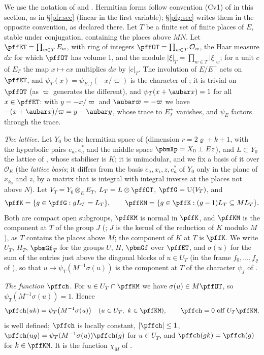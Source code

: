 \documentclass[10pt]{amsart}
\theoremstyle{definition}
\theoremstyle{remark}
\providecommand{\auO}{\mathcal O}
\providecommand{\auU}{\mathrm U}
\begin{document}
We use the notation of {\cite[\S2.1]{P51}} and {\cite[\S3.3]{P51}}. Hermitian forms follow convention (Cv1) of
{\cite[\S2.1]{P51}} in this section, as in \S\ref{pfr:sec} (linear in the first variable); \S\ref{pfg:sec} writes them
in the opposite convention, as declared there. Let $T$ be a finite set of
finite places of $E$, stable under conjugation, containing the places above $MN$. Let
$\pffET=\prod_{w\in T}E_w$, with ring of integers $\pffOT=\prod_{w\in T}\auO_w$, the Haar measure
$dx$ for which $\pffOT$ has volume $1$, and the module $|\xi|_T=\prod_{w\in T}|\xi|_w$; for a unit
$c$ of $E_T$ the map $x\mapsto cx$ multiplies $dx$ by $|c|_T$. The involution of $E/E^+$ acts on
$\pffET$, and $\psi_T(x)=\psi_{E,f}(-x/\varpi)$ is the character of {\cite[\S3.3.3]{P51}}; it is
trivial on $\pffOT$ (as $\varpi$ generates the different), and $\psi_T(x+\aubar x)=1$ for all
$x\in\pffET$: with $y=-x/\varpi$ and $\aubar\varpi=-\varpi$ we have $-(x+\aubar x)/\varpi=y-\aubar
y$, whose trace to $E^+_T$ vanishes, and $\psi_E$ factors through the trace.

\emph{The lattice.} Let $Y_0$ be the hermitian space of {\cite[\S2.1]{P51}} (dimension
$r=2\varrho+k+1$, with the hyperbolic pairs $e_a,e_a^*$ and the middle space $\pbmXp=X_0\perp
Ez$), and $L\subset Y_0$ the lattice of {\cite[\S2.1]{P51}}, whose stabiliser is $K$; it is
unimodular, and we fix a basis of it over $\auO_E$ (the \emph{lattice basis}; it differs from the
basis $e_a,x_i,z,e_a^*$ of $Y_0$ only in the plane of $x_{k_0}$ and $z$, by a matrix that is integral
with integral inverse at the places not above $N$). Let $V_T=Y_0\otimes_EE_T$,
$L_T=L\otimes\pffOT$, $\pffG=\auU(V_T)$, and
\[
\pffK=\{g\in\pffG:gL_T=L_T\},\qquad\pffKM=\{g\in\pffK:(g-1)L_T\subseteq ML_T\}.
\]
Both are compact open subgroups, $\pffKM$ is normal in $\pffK$, and $\pffKM$ is the component at $T$
of the group $J$ ({\cite[\S2.1]{P51}}; $J$ is the kernel of the reduction of $K$ modulo $M$),
as $T$ contains the places above $M$; the component of $K$ at $T$ is $\pffK$. We write $U_T$,
$H_T$, $\pbmGf_T$ for the groups $U$, $H$, $\pbmGf$ over $\pffET$, and $\sigma(u)$ for the sum of
the entries just above the diagonal blocks of $u\in U_T$ (in the frame
$f_0,\dots,f_\varrho$ of {\cite[\S3.3.2]{P51}}), so that $u\mapsto\psi_T(M^{-1}\sigma(u))$ is the
component at $T$ of the character $\psi_f$ of {\cite[\S3.3.2]{P51}}.

\emph{The function $\pffch$.} For $u\in U_T\cap\pffKM$ we have $\sigma(u)\in M\pffOT$, so
$\psi_T(M^{-1}\sigma(u))=1$. Hence
\begin{equation}\label{pff:eq-chi}
\pffch(uk)=\psi_T\bigl(M^{-1}\sigma(u)\bigr)\quad(u\in U_T,\ k\in\pffKM),\qquad\pffch=0\text{ off }U_T\pffKM,
\end{equation}
is well defined; $\pffch$ is locally constant, $|\pffch|\le1$, $\pffch(ug)=\psi_T(M^{-1}\sigma(u))
\pffch(g)$ for $u\in U_T$, and $\pffch(gk)=\pffch(g)$ for $k\in\pffKM$. It is the function $\chi_M$
of {\cite[\S3.3.7]{P51}}.
\end{document}
